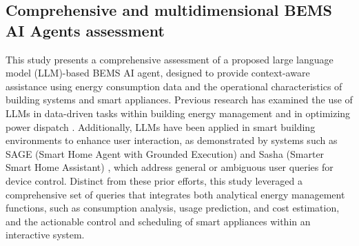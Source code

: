 \documentclass[final,3p,times]{elsarticle}
\begin{document}
\subsection{Comprehensive and multidimensional BEMS AI Agents assessment}

This study presents a comprehensive assessment of a proposed large language model (LLM)-based BEMS AI agent, designed to provide context-aware assistance using energy consumption data and the operational characteristics of building systems and smart appliances. Previous research has examined the use of LLMs in data-driven tasks within building energy management \cite{zhang2024generative} and in optimizing power dispatch \cite{zhou2024elecbench}. Additionally, LLMs have been applied in smart building environments to enhance user interaction, as demonstrated by systems such as SAGE (Smart Home Agent with Grounded Execution) \cite{rivkin2023sage} and Sasha (Smarter Smart Home Assistant) \cite{king2024sasha}, which address general or ambiguous user queries for device control. Distinct from these prior efforts, this study leveraged a comprehensive set of queries that integrates both analytical energy management functions, such as consumption analysis, usage prediction, and cost estimation, and the actionable control and scheduling of smart appliances within an interactive system.
\end{document}
